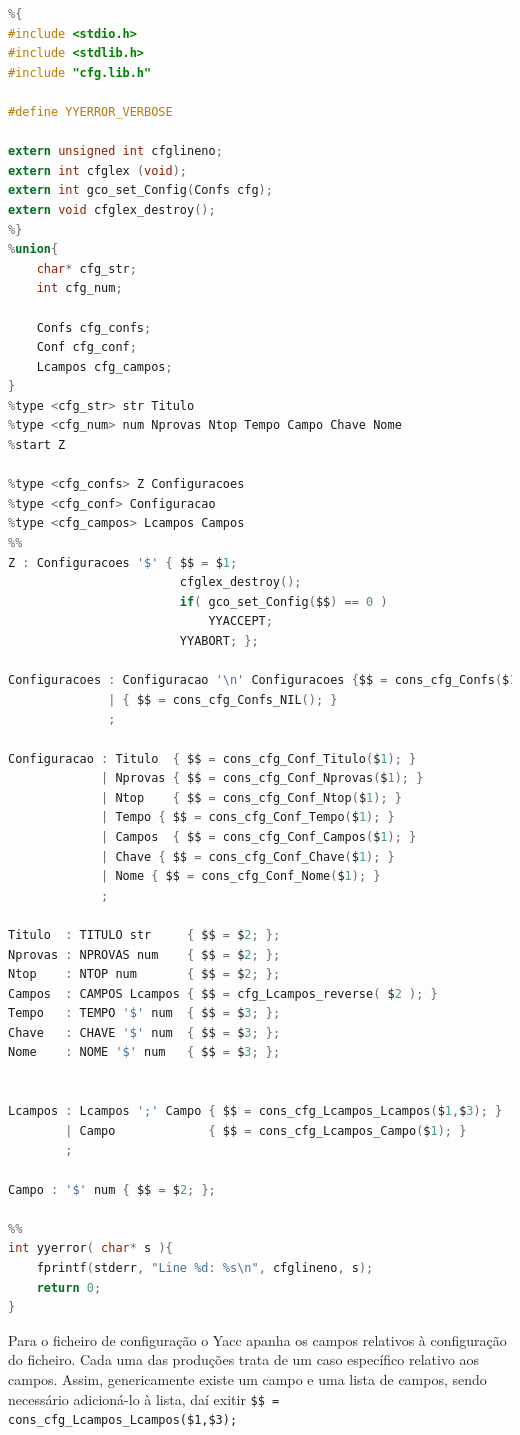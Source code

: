 \documentclass[11pt, a4paper, oneside]{article}
\begin{document}
\begin{lstlisting}[language=C, caption={YACC do ficheiro de configuração.}]
%token TITULO NPROVAS NTOP CAMPOS TEMPO CHAVE NOME str num
%{
#include <stdio.h>
#include <stdlib.h>
#include "cfg.lib.h"

#define YYERROR_VERBOSE

extern unsigned int cfglineno;
extern int cfglex (void);
extern int gco_set_Config(Confs cfg);
extern void cfglex_destroy();
%}
%union{
    char* cfg_str;
    int cfg_num;
    
    Confs cfg_confs;
    Conf cfg_conf;
    Lcampos cfg_campos;
}
%type <cfg_str> str Titulo
%type <cfg_num> num Nprovas Ntop Tempo Campo Chave Nome
%start Z

%type <cfg_confs> Z Configuracoes
%type <cfg_conf> Configuracao
%type <cfg_campos> Lcampos Campos
%%
Z : Configuracoes '$' { $$ = $1;
                        cfglex_destroy();
                        if( gco_set_Config($$) == 0 )
                            YYACCEPT;
                        YYABORT; };

Configuracoes : Configuracao '\n' Configuracoes {$$ = cons_cfg_Confs($1,$3);}
              | { $$ = cons_cfg_Confs_NIL(); }
              ;

Configuracao : Titulo  { $$ = cons_cfg_Conf_Titulo($1); }
             | Nprovas { $$ = cons_cfg_Conf_Nprovas($1); }
             | Ntop    { $$ = cons_cfg_Conf_Ntop($1); }
             | Tempo { $$ = cons_cfg_Conf_Tempo($1); }
             | Campos  { $$ = cons_cfg_Conf_Campos($1); }
             | Chave { $$ = cons_cfg_Conf_Chave($1); }
             | Nome { $$ = cons_cfg_Conf_Nome($1); }
             ;

Titulo  : TITULO str     { $$ = $2; };
Nprovas : NPROVAS num    { $$ = $2; };
Ntop    : NTOP num       { $$ = $2; };
Campos  : CAMPOS Lcampos { $$ = cfg_Lcampos_reverse( $2 ); }
Tempo   : TEMPO '$' num  { $$ = $3; };
Chave   : CHAVE '$' num  { $$ = $3; };
Nome    : NOME '$' num   { $$ = $3; };


Lcampos : Lcampos ';' Campo { $$ = cons_cfg_Lcampos_Lcampos($1,$3); }
        | Campo             { $$ = cons_cfg_Lcampos_Campo($1); }
        ;

Campo : '$' num { $$ = $2; };

%%
int yyerror( char* s ){
    fprintf(stderr, "Line %d: %s\n", cfglineno, s);
    return 0;
}
\end{lstlisting} 

Para o ficheiro de configuração o Yacc apanha os campos relativos à configuração do ficheiro. Cada uma das produções trata de um caso específico relativo aos campos. Assim, genericamente existe um campo e uma lista de campos, sendo necessário adicioná-lo à lista, daí exitir \texttt{\$\$ = cons\_cfg\_Lcampos\_Lcampos(\$1,\$3); }
\end{document}
